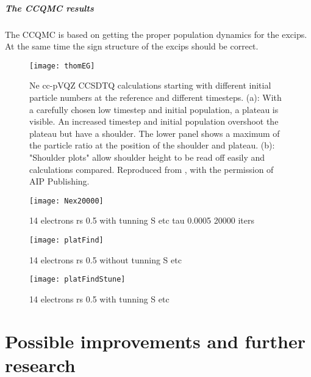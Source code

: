 \documentclass[twoside,english]{uiofysmaster}
\theoremstyle{definition}
\begin{document}
\subsubsection{The CCQMC results}
The CCQMC is based on getting the proper population dynamics for the excips. At the same time the sign structure of the excips should be correct. 





\begin{figure}[ht!]
	\centering
	\texttt{[image: thomEG]}
	\caption{Ne cc-pVQZ CCSDTQ calculations starting with different initial
		particle numbers at the reference and different timesteps. (a): With a carefully
		chosen low timestep and initial population, a plateau is visible. An increased
		timestep and initial population overshoot the plateau but have a shoulder.
		The lower panel shows a maximum of the particle ratio at the position of
		the shoulder and plateau. (b): "Shoulder plots" allow shoulder height to be
		read off easily and calculations compared. Reproduced from \cite{spencerDevelopmentsStochasticCoupled2016}, with the permission of AIP Publishing. }
	\label{fig:thomEG}
\end{figure}


\begin{figure}[ht!]
	\centering
	\texttt{[image: Nex20000]}
	\caption{14 electrons rs 0.5 with tunning S etc tau 0.0005 20000 iters}
	\label{fig:nx20k}
\end{figure}





\begin{landscape}
	\begin{figure}[ht!]
		\centering
		\texttt{[image: platFind]}
		\caption{14 electrons rs 0.5 without tunning S etc }
		\label{fig:platFind}
	\end{figure}
\end{landscape}

\begin{landscape}
	\begin{figure}[ht!]
		\centering
		\texttt{[image: platFindStune]}
		\caption{14 electrons rs 0.5 with tunning S etc }
		\label{fig:platFindStune}
	\end{figure}
	
\end{landscape}
\clearpage

\part{Possible improvements and further research}
\end{document}
